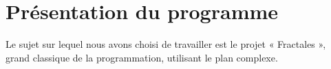 \documentclass[a4paper,11pt]{article} \usepackage[T1]{fontenc} \usepackage[utf8]{inputenc} \usepackage[francais]{babel}
\begin{document}
\tableofcontents          %
\vspace{3cm}
\newpage

\section{Présentation du programme}
Le sujet  sur lequel nous avons choisi de travailler est le projet « Fractales », grand classique de la programmation, utilisant le plan complexe.
\end{document}
